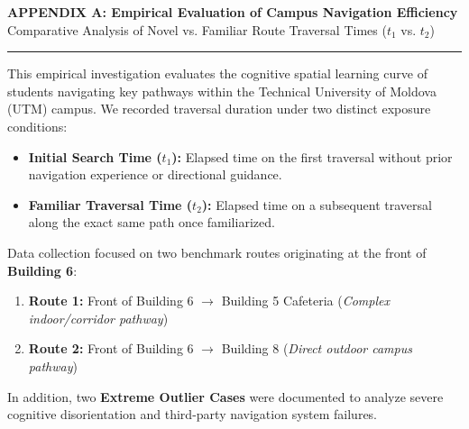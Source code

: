 \documentclass[11pt, a4paper]{article}
\begin{document}
\newpage
\pagestyle{plain}


\begin{center}
    {\Large \textbf{\textcolor{primary}{APPENDIX A: Empirical Evaluation of Campus Navigation Efficiency}}} \\[0.3em]
    {\large \textcolor{secondary}{Comparative Analysis of Novel vs. Familiar Route Traversal Times ($t_1$ vs. $t_2$)}} \\[0.5em]
    \rule{\textwidth}{1pt}
\end{center}

\vspace{0.5em}

\begin{tcolorbox}[title=Executive Summary \& Methodology]
This empirical investigation evaluates the cognitive spatial learning curve of students navigating key pathways within the Technical University of Moldova (UTM) campus. We recorded traversal duration under two distinct exposure conditions:
\begin{itemize}
    \item \textbf{Initial Search Time ($t_1$):} Elapsed time on the first traversal without prior navigation experience or directional guidance.
    \item \textbf{Familiar Traversal Time ($t_2$):} Elapsed time on a subsequent traversal along the exact same path once familiarized.
\end{itemize}
Data collection focused on two benchmark routes originating at the front of \textbf{Building 6}:
\begin{enumerate}
    \item \textbf{Route 1:} Front of Building 6 $\rightarrow$ Building 5 Cafeteria (\textit{Complex indoor/corridor pathway})
    \item \textbf{Route 2:} Front of Building 6 $\rightarrow$ Building 8 (\textit{Direct outdoor campus pathway})
\end{enumerate}
In addition, two \textbf{Extreme Outlier Cases} were documented to analyze severe cognitive disorientation and third-party navigation system failures.
\end{tcolorbox}

\vspace{1em}

\end{document}
